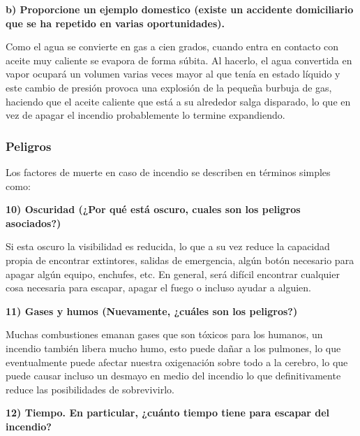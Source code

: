 \documentclass[letterpaper,11pt]{article}
\begin{document}
\textbf{b) Proporcione un ejemplo domestico (existe un accidente domiciliario que se ha repetido en varias oportunidades).}

Como el agua se convierte en gas a cien grados, cuando entra en contacto con aceite muy caliente se evapora de forma súbita. Al hacerlo, el agua convertida en vapor ocupará un volumen varias veces mayor al que tenía en estado líquido y este cambio de presión provoca una explosión de la pequeña burbuja de gas, haciendo que el aceite caliente que está a su alrededor salga disparado, lo que en vez de apagar el incendio probablemente lo termine expandiendo.



\subsubsection{Peligros}

Los factores de muerte en caso de incendio se describen en términos simples como:

\textbf{10) Oscuridad (¿Por qué está oscuro, cuales son los peligros asociados?)}

	Si esta oscuro la visibilidad es reducida, lo que a su vez reduce la capacidad propia de encontrar extintores, salidas de emergencia, algún botón necesario para apagar algún equipo, enchufes, etc. En general, será difícil encontrar cualquier cosa necesaria para escapar, apagar el fuego o incluso ayudar a alguien.

\textbf{11) Gases y humos (Nuevamente, ¿cuáles son los peligros?)}

Muchas combustiones emanan gases que son tóxicos para los humanos, un incendio también libera mucho humo, esto puede dañar a los pulmones, lo que eventualmente puede afectar nuestra oxigenación sobre todo a la cerebro, lo que puede causar incluso un desmayo en medio del incendio lo que definitivamente reduce las posibilidades de sobrevivirlo.

\textbf{12) Tiempo. En particular, ¿cuánto tiempo tiene para escapar del incendio?}
\end{document}
